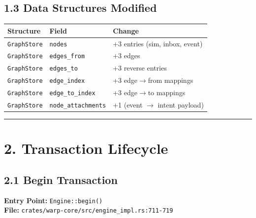 \documentclass[11pt]{book}
\newcounter{none}
\begin{document}
\subsection{1.3 Data Structures Modified}

{\def\LTcaptype{none}
\begin{longtable}[]{@{}
  >{\raggedright\arraybackslash}p{}
  >{\raggedright\arraybackslash}p{}
  >{\raggedright\arraybackslash}p{}@{}}
\toprule\noalign{}
Structure & Field & Change \\
\midrule\noalign{}
\endhead
\bottomrule\noalign{}
\endlastfoot
\texttt{GraphStore} & \texttt{nodes} & +3 entries (sim, inbox, event) \\
\texttt{GraphStore} & \texttt{edges\_from} & +3 edges \\
\texttt{GraphStore} & \texttt{edges\_to} & +3 reverse entries \\
\texttt{GraphStore} & \texttt{edge\_index} & +3 edge$\rightarrow$from mappings \\
\texttt{GraphStore} & \texttt{edge\_to\_index} & +3 edge$\rightarrow$to mappings \\
\texttt{GraphStore} & \texttt{node\_attachments} & +1 (event $\rightarrow$ intent payload) \\
\end{longtable}
}

\begin{center}\rule{0.5\linewidth}{0.5pt}\end{center}

\section{2. Transaction Lifecycle}\label{transaction-lifecycle}

\subsection{2.1 Begin Transaction}

\textbf{Entry Point:} \texttt{Engine::begin()} \\
\textbf{File:} \texttt{crates/warp-core/src/engine\_impl.rs:711-719}
\end{document}
